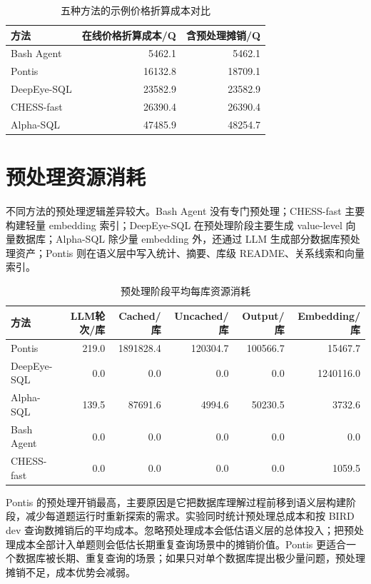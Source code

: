 \documentclass[
    bachelor,
    pdflinks,
]{xjtuthesis}
\newcommand{\topcaption}[1]{\caption{#1}}
\begin{document}
\begin{table}[htbp]\small
  \centering
  \topcaption{五种方法的示例价格折算成本对比}
  \label{tab:price_cost}
  \begin{tabular}{lrr}
    \toprule[1.5pt]
    \textbf{方法} & \textbf{在线价格折算成本/Q} & \textbf{含预处理摊销/Q} \\
    \midrule[1pt]
    Bash Agent & 5462.1 & 5462.1 \\
    Pontis & 16132.8 & 18709.1 \\
    DeepEye-SQL & 23582.9 & 23582.9 \\
    CHESS-fast & 26390.4 & 26390.4 \\
    Alpha-SQL & 47485.9 & 48254.7 \\
    \bottomrule[1.5pt]
  \end{tabular}
\end{table}

\section{预处理资源消耗}

不同方法的预处理逻辑差异较大。Bash Agent 没有专门预处理；CHESS-fast 主要构建轻量 embedding 索引；DeepEye-SQL 在预处理阶段主要生成 value-level 向量数据库；Alpha-SQL 除少量 embedding 外，还通过 LLM 生成部分数据库预处理资产；Pontis 则在语义层中写入统计、摘要、库级 README、关系线索和向量索引。

\begin{table}[htbp]\small
  \centering
  \topcaption{预处理阶段平均每库资源消耗}
  \label{tab:preprocess_cost}
  \begin{tabular}{lrrrrr}
    \toprule[1.5pt]
    \textbf{方法} & \textbf{LLM轮次/库} & \textbf{Cached/库} & \textbf{Uncached/库} & \textbf{Output/库} & \textbf{Embedding/库} \\
    \midrule[1pt]
    Pontis & 219.0 & 1891828.4 & 120304.7 & 100566.7 & 15467.7 \\
    DeepEye-SQL & 0.0 & 0.0 & 0.0 & 0.0 & 1240116.0 \\
    Alpha-SQL & 139.5 & 87691.6 & 4994.6 & 50230.5 & 3732.6 \\
    Bash Agent & 0.0 & 0.0 & 0.0 & 0.0 & 0.0 \\
    CHESS-fast & 0.0 & 0.0 & 0.0 & 0.0 & 1059.5 \\
    \bottomrule[1.5pt]
  \end{tabular}
\end{table}

Pontis 的预处理开销最高，主要原因是它把数据库理解过程前移到语义层构建阶段，减少每道题运行时重新探索的需求。实验同时统计预处理总成本和按 BIRD dev 查询数摊销后的平均成本。忽略预处理成本会低估语义层的总体投入；把预处理成本全部计入单题则会低估长期重复查询场景中的摊销价值。Pontis 更适合一个数据库被长期、重复查询的场景；如果只对单个数据库提出极少量问题，预处理摊销不足，成本优势会减弱。
\end{document}
